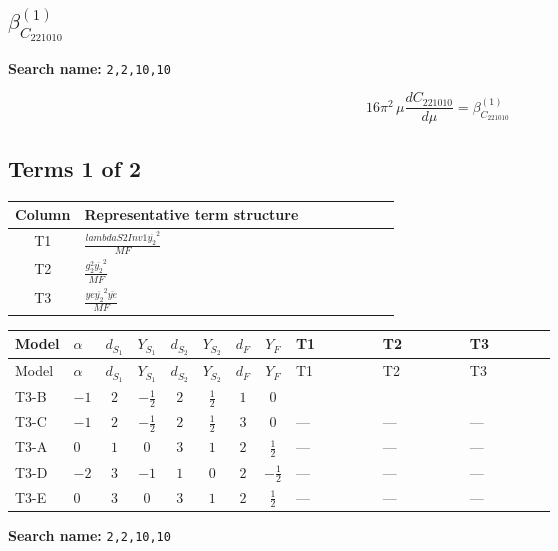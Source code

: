 \documentclass[8pt]{article}
\begin{document}
\begin{landscape}
\section*{$\beta_{C_{221010}}^{(1)}$}
\noindent\textbf{Search name: }\texttt{2,2,10,10}\par\smallskip
\[16\pi^2\,\mu\frac{d C_{221010}}{d\mu}=\beta_{C_{221010}}^{(1)}\]
\subsection*{Terms 1 of 2}
\begin{center}
\begin{tabular}{@{}c >{\raggedright\arraybackslash}p{0.82\linewidth}@{}}
\toprule
Column & Representative term structure \\
\midrule
T1 & \(\displaystyle \frac{lambdaS2Inv1 \overline{y_{2}}^{2}}{MF}\) \\
\midrule
T2 & \(\displaystyle \frac{g_{2}^{2} \overline{y_{2}}^{2}}{MF}\) \\
\midrule
T3 & \(\displaystyle \frac{ye \overline{y_{2}}^{2} \overline{ye}}{MF}\) \\
\midrule
\bottomrule
\end{tabular}
\end{center}
\smallskip
\tiny
\begin{longtable}{@{}llcccccc >{\raggedright\arraybackslash}p{0.21\linewidth} >{\raggedright\arraybackslash}p{0.21\linewidth} >{\raggedright\arraybackslash}p{0.21\linewidth}@{}}
\toprule
Model & $\alpha$ & $d_{S_1}$ & $Y_{S_1}$ & $d_{S_2}$ & $Y_{S_2}$ & $d_F$ & $Y_F$ & T1 & T2 & T3 \\
\midrule
\endfirsthead
\toprule
Model & $\alpha$ & $d_{S_1}$ & $Y_{S_1}$ & $d_{S_2}$ & $Y_{S_2}$ & $d_F$ & $Y_F$ & T1 & T2 & T3 \\
\midrule
\endhead
T3-B & $-1$ & $2$ & $-\frac{1}{2}$ & $2$ & $\frac{1}{2}$ & $1$ & $0$ & \scriptsize\adjustbox{max width=\linewidth}{$\begin{gathered} \frac{lambdaS2Inv1 \overline{y_{2}}^{2}}{2 MF}\end{gathered}$} & \scriptsize\adjustbox{max width=\linewidth}{$\begin{gathered} \frac{3 g_{2}^{2} \overline{y_{2}}^{2}}{4 MF}\end{gathered}$} & \scriptsize\adjustbox{max width=\linewidth}{$\begin{gathered} - \frac{ye \overline{y_{2}}^{2} \overline{ye}}{4 MF}\end{gathered}$} \\
\midrule
T3-C & $-1$ & $2$ & $-\frac{1}{2}$ & $2$ & $\frac{1}{2}$ & $3$ & $0$ & --- & --- & --- \\
\midrule
T3-A & $0$ & $1$ & $0$ & $3$ & $1$ & $2$ & $\frac{1}{2}$ & --- & --- & --- \\
\midrule
T3-D & $-2$ & $3$ & $-1$ & $1$ & $0$ & $2$ & $-\frac{1}{2}$ & --- & --- & --- \\
\midrule
T3-E & $0$ & $3$ & $0$ & $3$ & $1$ & $2$ & $\frac{1}{2}$ & --- & --- & --- \\
\midrule
\bottomrule
\end{longtable}
\clearpage
\noindent\textbf{Search name: }\texttt{2,2,10,10}\par\smallskip

\end{landscape}
\end{document}
